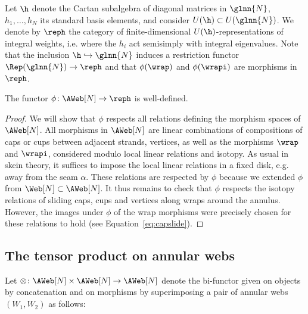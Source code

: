 Let $\h$ denote the Cartan subalgebra of diagonal matrices in $\glnn{N}$,
$h_1,\dots,h_N$ its standard basis elements, and consider $U(\h)\subset
U(\glnn{N})$. We denote by $\reph$ the category of finite-dimensional
$U(\h)$-representations of integral weights, i.e. where the $h_i$ act semisimply
with integral eigenvalues. Note that the inclusion $\h\hookrightarrow \glnn{N}$
induces a restriction functor $\Rep(\glnn{N})\to\reph$ and that $\phi(\wrap)$
and $\phi(\wrapi)$ are morphisms in $\reph$. 


\begin{lemma}\label{lem:welldef} The functor $\phi\colon \AWeb[N] \to \reph$ is well-defined. 
\end{lemma}
\begin{proof} We will show that $\phi$ respects all relations defining the
morphism spaces of $\AWeb[N]$. All morphisms in $\AWeb[N]$ are linear
combinations of compositions of caps or cups between adjacent strands, vertices,
as well as the morphisms $\wrap$ and $\wrapi$, considered modulo local linear
relations and isotopy. As usual in skein theory, it suffices to impose the local
linear relations in a fixed disk, e.g. away from the seam $\alpha$. These
relations are respected by $\phi$ because we extended $\phi$ from
$\Web[N]\subset \AWeb[N]$. It thus remains to check that $\phi$ respects the
isotopy relations of sliding caps, cups and vertices along
wraps around the annulus. However, the images under $\phi$ of the wrap morphisms
were precisely chosen for these relations to hold (see Equation~\eqref{eq:capslide}). 
\end{proof}



\subsection{The tensor product on annular webs}
Let $\otimes\colon \AWeb[N]\times \AWeb[N]\to \AWeb[N]$ denote the bi-functor
given on objects by concatenation and on morphisms by superimposing a pair of
annular webs $(W_1,W_2)$ as follows:

